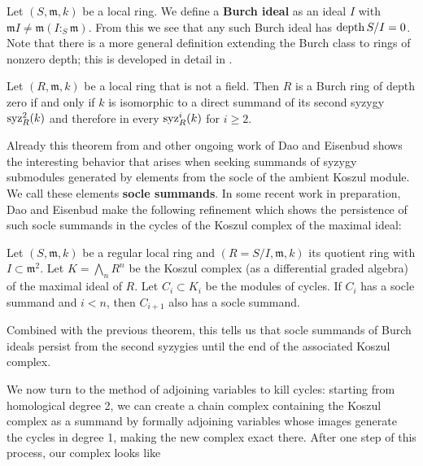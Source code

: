 \documentclass[twoside,12pt, leqno]{amsart}
\begin{document}
\begin{definition}
Let $(S, \mathfrak{m}, k)$ be a local ring. We define a \textbf{Burch ideal} as an ideal $I$ with $\mathfrak{m} I \neq \mathfrak{m}(I :_S \mathfrak{m})$. From this we see that any such Burch ideal has $\operatorname{depth} S / I = 0$. Note that there is a more general definition extending the Burch class to rings of nonzero depth; this is developed in detail in \cite{DE23}.

\end{definition}

\begin{theorem}
	Let $(R, \mathfrak{m}, k)$ be a local ring that is not a field. Then $R$ is a Burch ring of depth zero if and only if $k$ is isomorphic to a direct summand of its second syzygy $\operatorname{syz}_R^2 (k)$ and therefore in every $\operatorname{syz}_R^i (k)$ for $i \geqslant 2$.
\end{theorem}

Already this theorem from \cite{DKT20} and other ongoing work of Dao and Eisenbud shows the interesting behavior that arises when seeking summands of syzygy submodules generated by elements from the socle of the ambient Koszul module. We call these elements \textbf{socle summands}. In some recent work in preparation, Dao and Eisenbud make the following refinement which shows the persistence of such socle summands in the cycles of the Koszul complex of the maximal ideal:

\begin{theorem}
	Let $(S, \mathfrak{m}, k)$ be a regular local ring and $(R = S / I, \mathfrak{m}, k)$ its quotient ring with $I \subset \mathfrak{m}^2$. Let $K = \bigwedge_n R^n$ be the Koszul complex (as a differential graded algebra) of the maximal ideal of $R$. Let $C_i \subset K_i$ be the modules of cycles. If $C_i$ has a socle summand and $i < n$, then $C_{i+1}$ also has a socle summand.
\end{theorem}

Combined with the previous theorem, this tells us that socle summands of Burch ideals persist from the second syzygies until the end of the associated Koszul complex. 

We now turn to the method of adjoining variables to kill cycles: starting from homological degree 2, we can create a chain complex containing the Koszul complex as a summand by formally adjoining variables whose images generate the cycles in degree 1, making the new complex exact there. After one step of this process, our complex looks like
\end{document}
